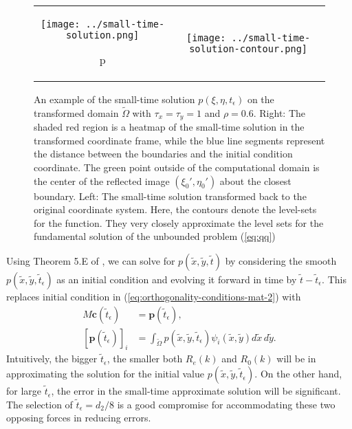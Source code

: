 \begin{figure}
  \centering
  \begin{tabular}{cc}
    \begin{minipage}{0.5\textwidth}
      \centering
      \texttt{[image: ../small-time-solution.png]}
    \end{minipage}p
    & \begin{minipage}{0.5\textwidth}
      \centering
      \texttt{[image: ../small-time-solution-contour.png]}
    \end{minipage}
  \end{tabular}
  \caption{An example of the small-time solution
    $p(\xi,\eta,t_\epsilon)$ on the transformed domain
    $\tilde{\Omega}$ with $\tau_x = \tau_y = 1$ and $\rho=0.6$. Right:
    The shaded red region is a heatmap of the small-time solution in
    the transformed coordinate frame, while the blue line segments
    represent the distance between the boundaries and the initial
    condition coordinate. The green point outside of the computational
    domain is the center of the reflected image $(\xi_0', \eta_0')$
    about the closest boundary. Left: The small-time solution
    transformed back to the original coordinate system. Here, the
    contours denote the level-sets for the function. They very closely
    approximate the level sets for the fundamental solution of the
    unbounded problem (\ref{eq:qq})}
  \label{fig:step-1-small-time}
\end{figure}
Using Theorem 5.E of \cite{zeidler1995applied}, we can solve for
$p(\tilde{x},\tilde{y},\tilde{t})$ by considering the smooth
$p(\tilde{x},\tilde{y},\tilde{t}_\epsilon)$ as an initial condition
and evolving it forward in time by $\tilde{t} -
\tilde{t}_\epsilon$. This replaces initial condition in
(\ref{eq:orthogonality-conditions-mat-2}) with
\begin{align}
  M \mathbf{c}(\tilde{t}_\epsilon) &= \mathbf{p}(\tilde{t}_\epsilon), \\
  [\mathbf{p}(\tilde{t}_\epsilon)]_i &= \displaystyle \int_{\tilde{\Omega}} p(\tilde{x},\tilde{y},\tilde{t}_\epsilon) \psi_i(\tilde{x},\tilde{y}) d\tilde{x}\,d\tilde{y}. \nonumber
\end{align}
Intuitively, the bigger $\tilde{t}_\epsilon$, the smaller both
$R_e(k)$ and $R_0(k)$ will be in approximating the solution for the
initial value $p(\tilde{x},\tilde{y},\tilde{t}_\epsilon)$. On the
other hand, for large $\tilde{t}_\epsilon$, the error in the
small-time approximate solution will be significant. The selection of
$\tilde{t}_\epsilon = d_2/8$ is a good compromise for accommodating
these two opposing forces in reducing errors.


